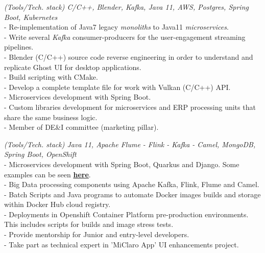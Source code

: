 \documentclass[]{CV-JuanCamiloFlorez}
\begin{document}
\begin{minipage}[t]{0.66\textwidth}
    \textit{(Tools/Tech. stack) C/C++, Blender, Kafka, Java 11, AWS, Postgres, Spring Boot, Kubernetes} \\
        - Re-implementation of Java7 legacy \textit{monoliths} to Java11 \textit{microservices}. \\
        - Write several \textit{Kafka} consumer-producers for the user-engagement streaming pipelines. \\
        - Blender (C/C++) source code reverse engineering in order to understand and replicate Ghost UI for desktop applications. \\
        - Build scripting with CMake. \\
        - Develop a complete template file for work with Vulkan (C/C++) API. \\
        - Microservices development with Spring Boot. \\
        - Custom libraries development for microservices and ERP processing units that share the same business logic. \\
        - Member of DE\&I committee (marketing pillar). \\
        \sectionsep

    \textit{(Tools/Tech. stack) Java 11, Apache Flume - Flink - Kafka - Camel, MongoDB, Spring Boot, OpenShift} \\
        - Microservices development with Spring Boot, Quarkus and Django. Some examples can be seen \textbf{\href{https://github.com/VanJFlorez/flink-kafka-fraud-detection}{here}}. \\
        - Big Data processing components using Apache Kafka, Flink, Flume and Camel. \\
        - Batch Scripts and Java programs to automate Docker images builds and storage within Docker Hub cloud registry. \\
        - Deployments in Openshift Container Platform pre-production environments. This includes scripts for builds and image stress tests. \\
        - Provide mentorship for Junior and entry-level developers. \\
        - Take part as technical expert in 'MiClaro App' UI enhancements project. \\
        \sectionsep


\end{minipage}
\end{document}
